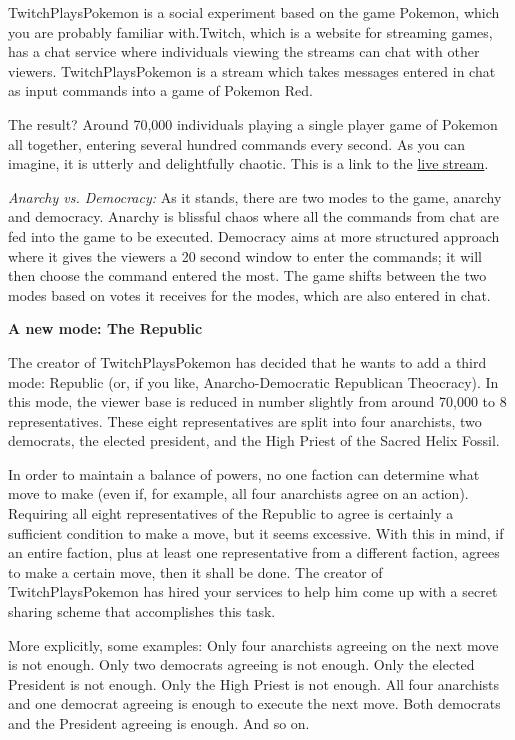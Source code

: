 \documentclass[]{article}
\begin{document}
\begin{qunlist}
TwitchPlaysPokemon is a social experiment based on the game Pokemon, which you are probably familiar with.Twitch, which is a website for streaming games, has a chat service where individuals viewing the streams can chat with other viewers. TwitchPlaysPokemon is a stream which takes messages entered in chat as input commands into a game of Pokemon Red.

The result? Around 70,000 individuals playing a single player game of Pokemon all together, entering several hundred commands every second. As you can imagine, it is utterly and delightfully chaotic. This is a link to the \href{http://www.twitch.tv/twitchplayspokemon}{live stream}.

\textit{Anarchy vs. Democracy:}
As it stands, there are two modes to the game, anarchy and democracy. Anarchy is blissful chaos where all the commands from chat are fed into the game to be executed. Democracy aims at more structured approach where it gives the viewers a 20 second window to enter the commands; it will then choose the command entered the most. The game shifts between the two modes based on votes it receives for the modes, which are also entered in chat.

\newpage
\textbf{A new mode: The Republic}

The creator of TwitchPlaysPokemon has decided that he wants to add a third mode: Republic (or, if you like, Anarcho-Democratic Republican Theocracy). 
In this mode, the viewer base is reduced in number slightly from around 70,000 to $8$ representatives. 
These eight representatives are split into four anarchists, two democrats, the elected president, and the High Priest of the Sacred Helix Fossil. 

In order to maintain a balance of powers, no one faction can determine what move to make (even if, for example, all four anarchists agree on an action). Requiring all eight representatives of the Republic to agree is certainly a sufficient condition to make a move, but it seems excessive. With this in mind, if an entire faction, plus at least one representative from a different faction, agrees to make a certain move, then it shall be done.
The creator of TwitchPlaysPokemon has hired your services to help him come up with a secret sharing scheme that accomplishes this task.

More explicitly, some examples: 
Only four anarchists agreeing on the next move is not enough. 
Only two democrats agreeing is not enough. 
Only the elected President is not enough. 
Only the High Priest is not enough. 
All four anarchists and one democrat agreeing is enough to execute the next move.
Both democrats and the President agreeing is enough.
And so on.


\end{qunlist}
\end{document}
